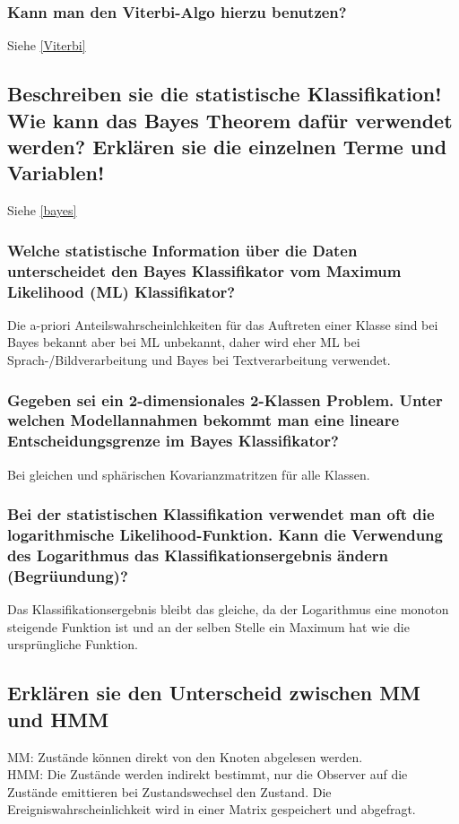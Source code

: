 \documentclass[12pt]{scrartcl}
\begin{document}
\subsubsection{Kann man den Viterbi-Algo hierzu benutzen?}
Siehe \ref{Viterbi}

\subsection{Beschreiben sie die statistische Klassifikation! Wie kann das Bayes Theorem dafür verwendet werden? Erklären sie die einzelnen Terme und Variablen!}
Siehe \ref{bayes}

\subsubsection{Welche statistische Information über die Daten unterscheidet den Bayes Klassifikator vom Maximum Likelihood (ML) Klassifikator?}
Die a-priori Anteilswahrscheinlchkeiten für das Auftreten einer Klasse sind bei Bayes bekannt aber bei ML unbekannt, daher wird eher ML bei Sprach-/Bildverarbeitung und Bayes bei Textverarbeitung verwendet.

\subsubsection{Gegeben sei ein 2-dimensionales 2-Klassen Problem. Unter welchen Modellannahmen bekommt man eine lineare Entscheidungsgrenze im Bayes Klassifikator?}
Bei gleichen und sphärischen Kovarianzmatritzen für alle Klassen.

\subsubsection{Bei der statistischen Klassifikation verwendet man oft die logarithmische Likelihood-Funktion. Kann die Verwendung des Logarithmus das Klassifikationsergebnis ändern (Begrüundung)?}
Das Klassifikationsergebnis bleibt das gleiche, da der Logarithmus eine monoton steigende Funktion ist und an der selben Stelle ein Maximum hat wie die ursprüngliche Funktion.

\subsection{Erklären sie den Unterscheid zwischen MM und HMM}
MM: Zustände können direkt von den Knoten abgelesen werden. \\
HMM: Die Zustände werden indirekt bestimmt, nur die Observer auf die Zustände emittieren bei Zustandswechsel den Zustand. Die Ereigniswahrscheinlichkeit wird in einer Matrix gespeichert und abgefragt.
\end{document}
